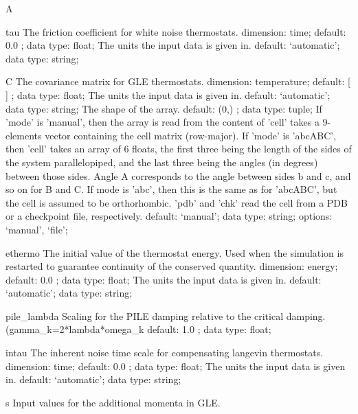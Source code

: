 \begin{ipifield}{}
\begin{ipifield}{A}
{}
\end{ipifield}
\begin{ipifield}{tau}%
{The friction coefficient for white noise thermostats.}%
{dimension: time; default:  0.0 ; data type: float; }%
{%
{The units the input data is given in.}%
{default: `automatic'; data type: string; }%
}
\end{ipifield}
\begin{ipifield}{C}%
{The covariance matrix for GLE thermostats.}%
{dimension: temperature; default:  [ ] ; data type: float; }%
{%
{The units the input data is given in.}%
{default: `automatic'; data type: string; }%
%
{The shape of the array.}%
{default:  (0,) ; data type: tuple; }%
%
{If 'mode' is 'manual', then the array is read from the content of 'cell' takes a 9-elements vector containing the cell matrix (row-major). If 'mode' is 'abcABC', then 'cell' takes an array of 6 floats, the first three being the length of the sides of the system parallelopiped, and the last three being the angles (in degrees) between those sides. Angle A corresponds to the angle between sides b and c, and so on for B and C. If mode is 'abc', then this is the same as for 'abcABC', but the cell is assumed to be orthorhombic. 'pdb' and 'chk' read the cell from a PDB or a checkpoint file, respectively.}%
{default: `manual'; data type: string; options: `manual', `file'; }%
}
\end{ipifield}
\begin{ipifield}{ethermo}%
{The initial value of the thermostat energy. Used when the simulation is restarted to guarantee continuity of the conserved quantity.}%
{dimension: energy; default:  0.0 ; data type: float; }%
{%
{The units the input data is given in.}%
{default: `automatic'; data type: string; }%
}
\end{ipifield}
\begin{ipifield}{pile\_lambda}%
{Scaling for the PILE damping relative to the critical damping. (gamma\_k=2*lambda*omega\_k}%
{default:  1.0 ; data type: float; }%
{}
\end{ipifield}
\begin{ipifield}{intau}%
{The inherent noise time scale for compensating langevin thermostats.}%
{dimension: time; default:  0.0 ; data type: float; }%
{%
{The units the input data is given in.}%
{default: `automatic'; data type: string; }%
}
\end{ipifield}
\begin{ipifield}{s}%
{Input values for the additional momenta in GLE.}%

\end{ipifield}
\end{ipifield}
